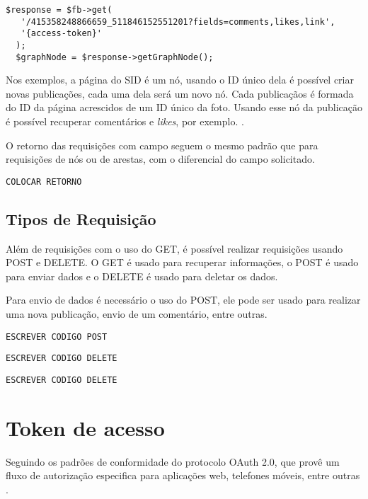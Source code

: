 \begin{lstlisting}[caption={Requsição de diversos atributos},label={lst:requisicao8}]
  $response = $fb->get(
   '/415358248866659_511846152551201?fields=comments,likes,link', 
   '{access-token}'
  );
  $graphNode = $response->getGraphNode();
\end{lstlisting}

Nos exemplos, a página do SID é um nó, usando o ID único dela é possível criar novas publicações, cada uma dela será um novo nó. Cada publicaçãos é formada do ID da página acrescidos de um ID único da foto. Usando esse nó da publicação é possível recuperar comentários e \textit{likes}, por exemplo. \cite{facebook2018b}.

O retorno das requisições com campo seguem o mesmo padrão que para requisições de nós ou de arestas, com o diferencial do campo solicitado.

\begin{lstlisting}[caption={Retorno das requisições \ref{lst:requisicao7} e \ref{lst:requisicao8} (Campos)}, label={lst:retornoRequisicao8}]
COLOCAR RETORNO
\end{lstlisting}

\subsection{Tipos de Requisição}
Além de requisições com o uso do GET, é possível realizar requisições usando POST e DELETE. O GET é usado para recuperar informações, o POST é usado para enviar dados e o DELETE é usado para deletar os dados.

Para envio de dados é necessário o uso do POST, ele pode ser usado para realizar uma nova publicação, envio de um comentário, entre outras.
\begin{lstlisting}[caption={Requsição POST},label={lst:requisicao9}]
ESCREVER CODIGO POST
\end{lstlisting}

\begin{lstlisting}[caption={Requsição DELETE},label={lst:requisicao10}]
ESCREVER CODIGO DELETE
\end{lstlisting}

\begin{lstlisting}[caption={Retorno das requisições \ref{lst:requisicao9} e \ref{lst:requisicao10}},label={lst:requisicao11}]
ESCREVER CODIGO DELETE
\end{lstlisting}

\section{Token de acesso}
\label{sec:tokenDeAcesso}
Seguindo os padrões de conformidade do protocolo OAuth 2.0, que provê um fluxo de autorização especifica para aplicações web, telefones móveis, entre outras \cite{oauth2018}. 


